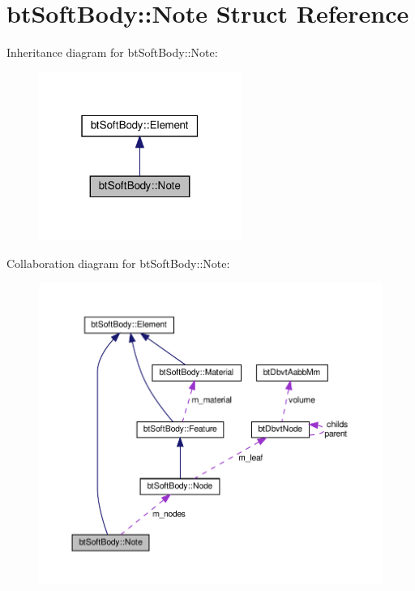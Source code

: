 \hypertarget{structbtSoftBody_1_1Note}{}\section{bt\+Soft\+Body\+:\+:Note Struct Reference}
\label{structbtSoftBody_1_1Note}


Inheritance diagram for bt\+Soft\+Body\+:\+:Note\+:
\nopagebreak
\begin{figure}[H]
\begin{center}
\leavevmode
\includegraphics[width=187pt]{structbtSoftBody_1_1Note__inherit__graph}
\end{center}
\end{figure}


Collaboration diagram for bt\+Soft\+Body\+:\+:Note\+:
\nopagebreak
\begin{figure}[H]
\begin{center}
\leavevmode
\includegraphics[width=350pt]{structbtSoftBody_1_1Note__coll__graph}
\end{center}
\end{figure}
